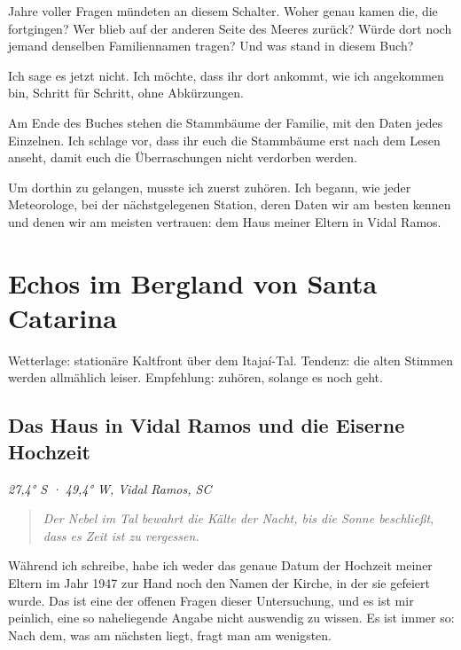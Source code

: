 \documentclass[
  ngerman,
  11pt,
  openany]{book}
\newenvironment{boletim}{\begin{center}\begin{minipage}{0.85\linewidth}\small\itshape}{\end{minipage}\end{center}}
\begin{document}
Jahre voller Fragen mündeten an diesem Schalter. Woher genau kamen die,
die fortgingen? Wer blieb auf der anderen Seite des Meeres zurück? Würde
dort noch jemand denselben Familiennamen tragen? Und was stand in diesem
Buch?

Ich sage es jetzt nicht. Ich möchte, dass ihr dort ankommt, wie ich
angekommen bin, Schritt für Schritt, ohne Abkürzungen.

Am Ende des Buches stehen die Stammbäume der Familie, mit den Daten
jedes Einzelnen. Ich schlage vor, dass ihr euch die Stammbäume erst nach
dem Lesen anseht, damit euch die Überraschungen nicht verdorben werden.

Um dorthin zu gelangen, musste ich zuerst zuhören. Ich begann, wie jeder
Meteorologe, bei der nächstgelegenen Station, deren Daten wir am besten
kennen und denen wir am meisten vertrauen: dem Haus meiner Eltern in
Vidal Ramos.

\part{Echos im Bergland von Santa
Catarina}\label{echos-im-bergland-von-santa-catarina}

\begin{boletim}

Wetterlage: stationäre Kaltfront über dem Itajaí-Tal. Tendenz: die alten
Stimmen werden allmählich leiser. Empfehlung: zuhören, solange es noch
geht.

\end{boletim}

\chapter{Das Haus in Vidal Ramos und die Eiserne Hochzeit}\label{cap-1}

\emph{27,4° S · 49,4° W, Vidal Ramos, SC}

\begin{quote}
\emph{Der Nebel im Tal bewahrt die Kälte der Nacht, bis die Sonne
beschließt, dass es Zeit ist zu vergessen.}
\end{quote}

Während ich schreibe, habe ich weder das genaue Datum der Hochzeit
meiner Eltern im Jahr 1947 zur Hand noch den Namen der Kirche, in der
sie gefeiert wurde. Das ist eine der offenen Fragen dieser Untersuchung,
und es ist mir peinlich, eine so naheliegende Angabe nicht auswendig zu
wissen. Es ist immer so: Nach dem, was am nächsten liegt, fragt man am
wenigsten.
\end{document}
